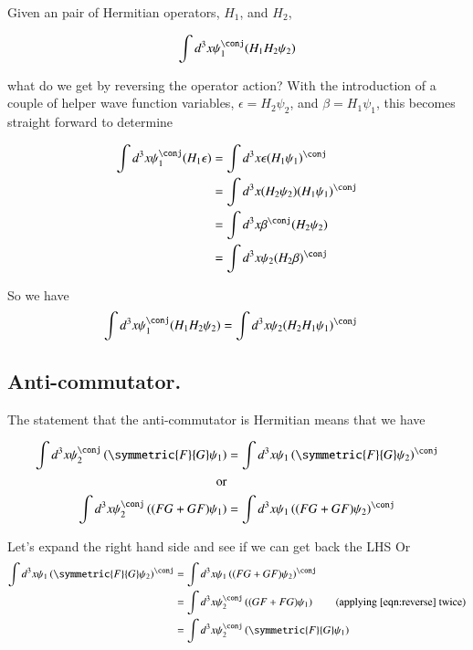 \documentclass{article}
\begin{document}
Given an pair of Hermitian operators, $H_1$, and $H_2$, 

\begin{align*}
\int d^3 x \psi_1^\conj (H_1 H_2 \psi_2)
\end{align*}

what do we get by reversing the operator action?  With the introduction of a couple of helper wave function variables, $\epsilon = H_2 \psi_2$, and $\beta = H_1 \psi_1$, 
this becomes straight forward to determine

\begin{align*}
\int d^3 x \psi_1^\conj (H_1 \epsilon)
&=
\int d^3 x \epsilon (H_1 \psi_1)^\conj \\
&=
\int d^3 x (H_2 \psi_2) (H_1 \psi_1)^\conj \\
&=
\int d^3 x \beta^\conj (H_2 \psi_2) \\
&=
\int d^3 x \psi_2 (H_2 \beta)^\conj \\
\end{align*}

So we have
\begin{align}\label{eqn:reverse}
\int d^3 x \psi_1^\conj (H_1 H_2 \psi_2) &= \int d^3 x \psi_2 (H_2 H_1 \psi_1)^\conj 
\end{align}

\subsection{Anti-commutator. }

The statement that the anti-commutator is Hermitian means that we have

\begin{align*}
\int d^3 x \psi_2^\conj \left( \symmetric{F}{G} \psi_1 \right) &= \int d^3 x \psi_1 \left(\symmetric{F}{G} \psi_2 \right)^\conj \\
\text{or} \\
\int d^3 x \psi_2^\conj \left( (F G + G F) \psi_1 \right) &= \int d^3 x \psi_1 \left((F G + G F) \psi_2 \right)^\conj \\
\end{align*}

Let's expand the right hand side and see if we can get back the LHS
Or
\begin{align*}
\int d^3 x \psi_1 \left(\symmetric{F}{G} \psi_2 \right)^\conj 
&=
\int d^3 x \psi_1 \left((F G + G F) \psi_2 \right)^\conj \\
&=
\int d^3 x \psi_2^\conj \left((G F + F G) \psi_1 \right) \quad\quad \text{(applying \ref{eqn:reverse} twice)} \\
&=
\int d^3 x \psi_2^\conj \left( \symmetric{F}{G} \psi_1 \right) \\
\end{align*}
\end{document}
